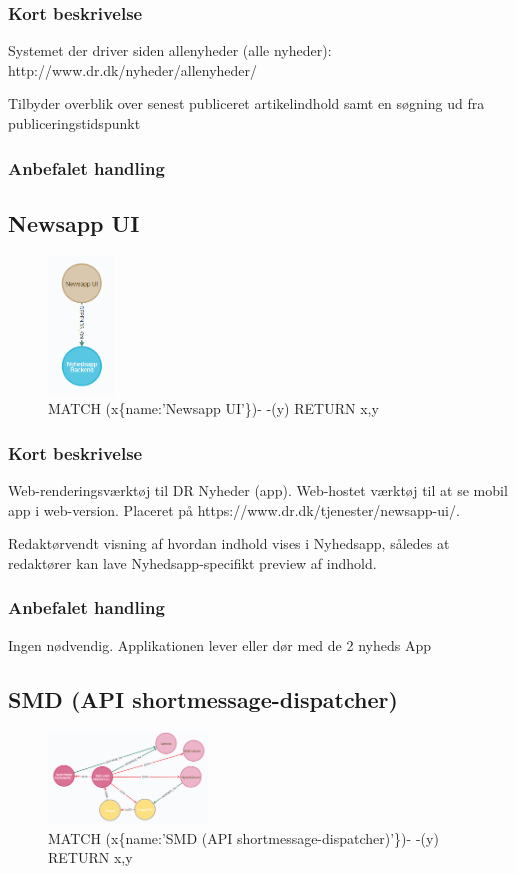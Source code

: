 \documentclass{article}
\begin{document}
\subsubsection{Kort beskrivelse}
Systemet der driver siden allenyheder (alle nyheder): http://www.dr.dk/nyheder/allenyheder/	

Tilbyder overblik over senest publiceret artikelindhold samt en søgning ud fra publiceringstidspunkt
\subsubsection{Anbefalet handling}



\subsection{Newsapp UI}
\begin{figure}[h]
\includegraphics[width=50pt]{NyhedsAppUi.PNG}
\caption{MATCH (x\{name:'Newsapp UI'\})- -(y) RETURN x,y}
\end{figure}
\subsubsection{Kort beskrivelse}
Web-renderingsværktøj til DR Nyheder (app). Web-hostet værktøj til at se mobil app i web-version. Placeret på https://www.dr.dk/tjenester/newsapp-ui/.	

Redaktørvendt visning af hvordan indhold vises i Nyhedsapp, således at redaktører kan lave Nyhedsapp-specifikt preview af indhold.
\subsubsection{Anbefalet handling}
Ingen nødvendig. Applikationen lever eller dør med de 2 nyheds App


\subsection{SMD (API shortmessage-dispatcher)}
\begin{figure}[h]
\includegraphics[width=120pt]{SMD.PNG}
\caption{MATCH (x\{name:'SMD (API shortmessage-dispatcher)'\})- -(y) RETURN x,y}
\end{figure}
\end{document}

